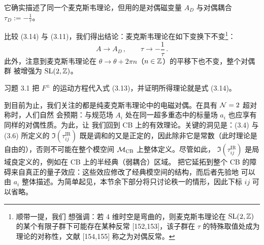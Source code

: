 
它确实描述了同一个麦克斯韦理论，但用的是对偶磁变量 $A_D$ 与对偶耦合
$\tau_D := -\frac{1}{\tau}$。

比较 (3.14) 与 (3.11)，我们得出结论：麦克斯韦理论在如下变换下不变\footnote{顺带一提，我们
想强调：若 4 维时空是弯曲的，则麦克斯韦理论在 $\mathrm{SL}(2,\mathbb{Z})$ 的某个有限子群下可能存在某种反常
[152,153]，该子群在 $\tau$ 的特殊取值处成为理论的对称性，文献 [154,155] 称之为对偶反常。}：
\begin{equation}
  A\to A_D\,,\qquad \tau\to-\frac{1}{\tau}\,.
  \tag{3.15}
\end{equation}
此外，注意到麦克斯韦理论在 $\theta\to\theta+2\pi n$（$n\in\mathbb{Z}$）的平移下也不变，整个对偶群
被增强为 $\mathrm{SL}(2,\mathbb{Z})$。

\begin{exercisebox}{习题 3.1}
  把 $F^\pm$ 的运动方程代入式 (3.13)，并证明所得理论就是式 (3.14)。
\end{exercisebox}


到目前为止，我们关注的都是纯麦克斯韦理论中的电磁对偶。在具有 $\mathcal{N}=2$ 超对称时，人们自然
会预期：与规范场 $A_i$ 处在同一超多重态中的标量场 $a_i$ 也应享有同样的对偶性质。为此，让
我们回到 CB 上的有效理论。关键的洞见是：(3.4) 与 (3.6) 所定义的
$\Im\left(\tau^{\mathrm{IR}}_{ij}\right)$ 既是调和的又是正定的，因此除非它是常数（此时理论是
自由的），否则不可能在整个模空间 $\mathcal{M}_{\mathrm{CB}}$ 上整体定义。尽管如此，
$\Im\left(\tau^{\mathrm{IR}}_{ij}\right)$ 是局域良定义的，例如在 CB 上的半经典（弱耦合）区域。
把它延拓到整个 CB 的障碍来自真正的量子效应：这些效应修改了经典模空间的结构，而后者先验地
可以由 $a_i$ 整体描述。为简单起见，本节余下部分将只讨论秩一的情形，因此下标 $ij$ 可以省略。

